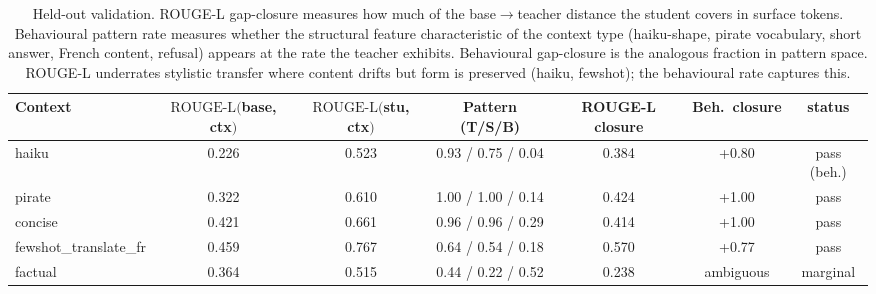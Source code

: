 \begin{table}[t]
\centering
\caption{Held-out validation. ROUGE-L gap-closure measures how much of
the base$\to$teacher distance the student covers in surface tokens.
Behavioural pattern rate measures whether the structural feature
characteristic of the context type (haiku-shape, pirate vocabulary,
short answer, French content, refusal) appears at the rate the teacher
exhibits. Behavioural gap-closure is the analogous fraction in pattern
space. ROUGE-L underrates stylistic transfer where content drifts but
form is preserved (haiku, fewshot); the behavioural rate captures this.}
\label{tab:held_out}
\small
\begin{tabular}{lcc|ccc|c}
\toprule
Context & $\text{ROUGE-L}($base, ctx$)$ & $\text{ROUGE-L}($stu, ctx$)$ &
  Pattern (T/S/B) & ROUGE-L closure & Beh.\ closure & status \\
\midrule
haiku   & 0.226 & 0.523 & 0.93 / 0.75 / 0.04 & 0.384 & +0.80 & pass (beh.) \\
pirate  & 0.322 & 0.610 & 1.00 / 1.00 / 0.14 & 0.424 & +1.00 & pass \\
concise & 0.421 & 0.661 & 0.96 / 0.96 / 0.29 & 0.414 & +1.00 & pass \\
fewshot\_translate\_fr & 0.459 & 0.767 & 0.64 / 0.54 / 0.18 & 0.570 & +0.77 & pass \\
factual & 0.364 & 0.515 & 0.44 / 0.22 / 0.52 & 0.238 & ambiguous & marginal \\
\bottomrule
\end{tabular}
\end{table}
